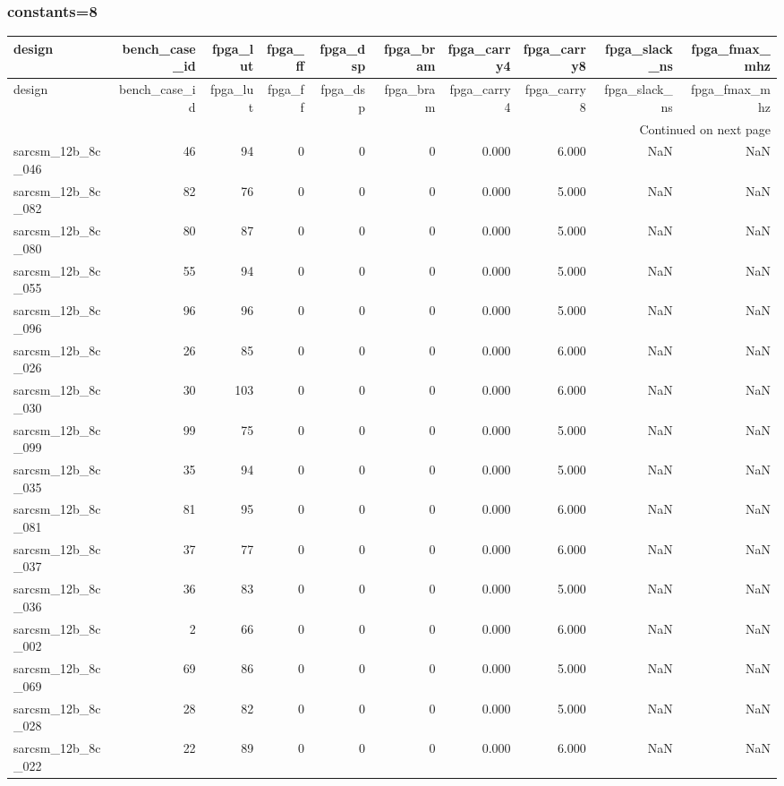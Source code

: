 \documentclass{article}
\begin{document}
\subsubsection*{constants=8}
\begin{longtable}{lrrrrrrrrr}
\toprule
design & bench\_case\_id & fpga\_lut & fpga\_ff & fpga\_dsp & fpga\_bram & fpga\_carry4 & fpga\_carry8 & fpga\_slack\_ns & fpga\_fmax\_mhz \\
\midrule
\endfirsthead
\toprule
design & bench\_case\_id & fpga\_lut & fpga\_ff & fpga\_dsp & fpga\_bram & fpga\_carry4 & fpga\_carry8 & fpga\_slack\_ns & fpga\_fmax\_mhz \\
\midrule
\endhead
\midrule
\multicolumn{10}{r}{Continued on next page} \\
\midrule
\endfoot
\bottomrule
\endlastfoot
sarcsm\_12b\_8c\_046 & 46 & 94 & 0 & 0 & 0 & 0.000 & 6.000 & NaN & NaN \\
sarcsm\_12b\_8c\_082 & 82 & 76 & 0 & 0 & 0 & 0.000 & 5.000 & NaN & NaN \\
sarcsm\_12b\_8c\_080 & 80 & 87 & 0 & 0 & 0 & 0.000 & 5.000 & NaN & NaN \\
sarcsm\_12b\_8c\_055 & 55 & 94 & 0 & 0 & 0 & 0.000 & 5.000 & NaN & NaN \\
sarcsm\_12b\_8c\_096 & 96 & 96 & 0 & 0 & 0 & 0.000 & 5.000 & NaN & NaN \\
sarcsm\_12b\_8c\_026 & 26 & 85 & 0 & 0 & 0 & 0.000 & 6.000 & NaN & NaN \\
sarcsm\_12b\_8c\_030 & 30 & 103 & 0 & 0 & 0 & 0.000 & 6.000 & NaN & NaN \\
sarcsm\_12b\_8c\_099 & 99 & 75 & 0 & 0 & 0 & 0.000 & 5.000 & NaN & NaN \\
sarcsm\_12b\_8c\_035 & 35 & 94 & 0 & 0 & 0 & 0.000 & 5.000 & NaN & NaN \\
sarcsm\_12b\_8c\_081 & 81 & 95 & 0 & 0 & 0 & 0.000 & 6.000 & NaN & NaN \\
sarcsm\_12b\_8c\_037 & 37 & 77 & 0 & 0 & 0 & 0.000 & 6.000 & NaN & NaN \\
sarcsm\_12b\_8c\_036 & 36 & 83 & 0 & 0 & 0 & 0.000 & 5.000 & NaN & NaN \\
sarcsm\_12b\_8c\_002 & 2 & 66 & 0 & 0 & 0 & 0.000 & 6.000 & NaN & NaN \\
sarcsm\_12b\_8c\_069 & 69 & 86 & 0 & 0 & 0 & 0.000 & 5.000 & NaN & NaN \\
sarcsm\_12b\_8c\_028 & 28 & 82 & 0 & 0 & 0 & 0.000 & 5.000 & NaN & NaN \\
sarcsm\_12b\_8c\_022 & 22 & 89 & 0 & 0 & 0 & 0.000 & 6.000 & NaN & NaN \\

\end{longtable}
\end{document}
